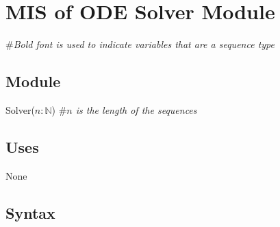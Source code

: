 \documentclass[12pt, titlepage]{article}
\begin{document}
\begin{comment}
\subsubsection{Assumptions}
N/A
\subsubsection{Access Routine Semantics}

\noindent Position\_Top():
\begin{itemize}
\item transition: N/A 
\item output: $out:= $$\iint {\theta_1}' \,d{\theta_1}\,d{\theta_2}$$ $
\item exception: N/A
\end{itemize}

\noindent Position\_Bottom():
\begin{itemize}
\item transition: N/A 
\item output: $out:= $$\iint {\theta_2}' \,d{\theta_1}\,d{\theta_2}$$ $
\item exception: N/A
\end{itemize}

\subsubsection{Local Functions}

N/A

\newpage
\end{comment}

\section{MIS of ODE Solver Module} \label{ODEModule} 
\#\textit{Bold font is used to indicate variables that are a sequence
  type} 
\subsection{Module}
Solver($n: \mathbb{N}$) \#\textit{$n$ is the length of the sequences}

\subsection{Uses}
None

\subsection{Syntax}
\end{document}

